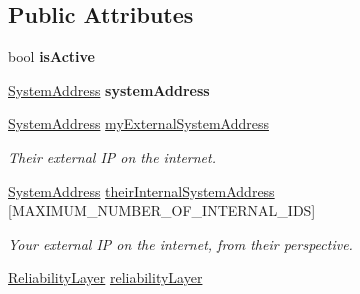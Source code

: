 \subsection*{Public Attributes}
\begin{DoxyCompactItemize}
\item 
\hypertarget{struct_rak_net_1_1_rak_peer_1_1_remote_system_struct_a05b3449587b788078b0085635d0af608}{bool {\bfseries is\-Active}}\label{struct_rak_net_1_1_rak_peer_1_1_remote_system_struct_a05b3449587b788078b0085635d0af608}

\item 
\hypertarget{struct_rak_net_1_1_rak_peer_1_1_remote_system_struct_a47350ca537a1ea083c2e3ad832955992}{\hyperlink{struct_rak_net_1_1_system_address}{System\-Address} {\bfseries system\-Address}}\label{struct_rak_net_1_1_rak_peer_1_1_remote_system_struct_a47350ca537a1ea083c2e3ad832955992}

\item 
\hypertarget{struct_rak_net_1_1_rak_peer_1_1_remote_system_struct_a57002b4af19c8f378c333d37cb47f9d6}{\hyperlink{struct_rak_net_1_1_system_address}{System\-Address} \hyperlink{struct_rak_net_1_1_rak_peer_1_1_remote_system_struct_a57002b4af19c8f378c333d37cb47f9d6}{my\-External\-System\-Address}}\label{struct_rak_net_1_1_rak_peer_1_1_remote_system_struct_a57002b4af19c8f378c333d37cb47f9d6}

\begin{DoxyCompactList}\small\item\em Their external I\-P on the internet. \end{DoxyCompactList}\item 
\hypertarget{struct_rak_net_1_1_rak_peer_1_1_remote_system_struct_aada74fe16b0624dc53d9eb351c675182}{\hyperlink{struct_rak_net_1_1_system_address}{System\-Address} \hyperlink{struct_rak_net_1_1_rak_peer_1_1_remote_system_struct_aada74fe16b0624dc53d9eb351c675182}{their\-Internal\-System\-Address} \mbox{[}M\-A\-X\-I\-M\-U\-M\-\_\-\-N\-U\-M\-B\-E\-R\-\_\-\-O\-F\-\_\-\-I\-N\-T\-E\-R\-N\-A\-L\-\_\-\-I\-D\-S\mbox{]}}\label{struct_rak_net_1_1_rak_peer_1_1_remote_system_struct_aada74fe16b0624dc53d9eb351c675182}

\begin{DoxyCompactList}\small\item\em Your external I\-P on the internet, from their perspective. \end{DoxyCompactList}\item 
\hypertarget{struct_rak_net_1_1_rak_peer_1_1_remote_system_struct_a659ea2f6a6b99579c3f719542f1298f7}{\hyperlink{class_rak_net_1_1_reliability_layer}{Reliability\-Layer} \hyperlink{struct_rak_net_1_1_rak_peer_1_1_remote_system_struct_a659ea2f6a6b99579c3f719542f1298f7}{reliability\-Layer}}\label{struct_rak_net_1_1_rak_peer_1_1_remote_system_struct_a659ea2f6a6b99579c3f719542f1298f7}


\end{DoxyCompactItemize}

